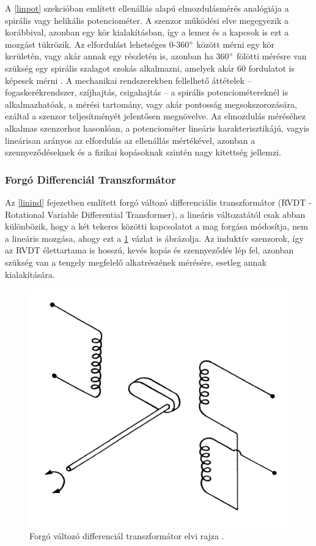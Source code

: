 A \ref{linpot} szekcióban említett ellenállás alapú elmozdulásmérés analógiája a spirális vagy helikális potenciométer. A szenzor működési elve megegyezik a korábbival, azonban egy kör kialakításban, így a lemez és a kapcsok is ezt a mozgást tükrözik. Az elfordulást lehetséges 0-360$\degree$ között mérni egy kör kerületén, vagy akár annak egy részletén is, azonban ha 360$\degree$ fölötti mérésre van szükség egy spirális szalagot szokás alkalmazni, amelyek akár 60 fordulatot is képesek mérni \cite{Morris2016b}. A mechanikai rendszerekben fellelhető áttételek -- fogaskerékrendszer, szíjhajtás, csigahajtás -- a spirális potenciométereknél is alkalmazhatóak, a mérési tartomány, vagy akár pontosság megsokszorozására, ezáltal a szenzor teljesítményét jelentősen megnövelve. Az elmozdulás méréséhez alkalmas szenzorhoz hasonlóan, a potenciométer lineáris karakterisztikájú, vagyis lineárisan arányos az elfordulás az ellenállás mértékével, azonban a szennyeződéseknek és a fizikai kopásoknak szintén nagy kitettség jellemzi.

\subsubsection{Forgó Differenciál Transzformátor}

Az \ref{linind} fejezetben említett forgó változó differenciális transzformátor (RVDT - Rotational Variable Differential Transformer), a lineáris változatától csak abban különbözik, hogy a két tekercs közötti kapcsolatot a mag forgása módosítja, nem a lineáris mozgása, ahogy ezt a \ref{rvdt} vázlat is ábrázolja. Az induktív szenzorok, így az RVDT élettartama is hosszú, kevés kopás és szennyeződés lép fel, azonban szükség van a tengely megfelelő alkatrészének mérésére, esetleg annak kialakítására.
\begin{figure}
	\centering
	\includegraphics[width=\columnwidth/2]{figures/rvdt.png}
	\caption{Forgó változó differenciál transzformátor elvi rajza \cite{Morris2016b}.}
	\label{rvdt}
\end{figure}

